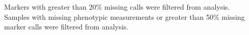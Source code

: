 \begin{table*}[htbp]
\begin{tableminipage}{\textwidth}
\label{tab:benchmark-datasets}
\footnotesize  
\raggedright

\footnotemark[1] Markers with greater than 20\% missing calls were filtered from analysis.
\\
\footnotemark[2] Samples with missing phenotypic measurements or greater than 50\% missing marker calls were filtered from analysis.

\end{tableminipage}
\end{table*}
